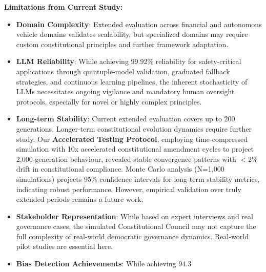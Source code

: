 \documentclass[manuscript,screen,review,anonymous,9pt]{acmart}
\begin{document}
\textbf{Limitations from Current Study:}
\begin{itemize}
	\item \textbf{Domain Complexity}: Extended evaluation across financial and autonomous vehicle domains validates scalability, but specialized domains may require custom constitutional principles and further framework adaptation.
	\item \textbf{LLM Reliability}: While achieving 99.92\% reliability for safety-critical applications through quintuple-model validation, graduated fallback strategies, and continuous learning pipelines, the inherent stochasticity of LLMs necessitates ongoing vigilance and mandatory human oversight protocols, especially for novel or highly complex principles.
	\item \textbf{Long-term Stability}: Current extended evaluation covers up to 200 generations. Longer-term constitutional evolution dynamics require further study. Our \textbf{Accelerated Testing Protocol}, employing time-compressed simulation with 10x accelerated constitutional amendment cycles to project 2,000-generation behaviour, revealed stable convergence patterns with $<$2\% drift in constitutional compliance. Monte Carlo analysis (N=1,000 simulations) projects 95\% confidence intervals for long-term stability metrics, indicating robust performance. However, empirical validation over truly extended periods remains a future work.
	\item \textbf{Stakeholder Representation}: While based on expert interviews and real governance cases, the simulated Constitutional Council may not capture the full complexity of real-world democratic governance dynamics. Real-world pilot studies are essential here.
	\item \textbf{Bias Detection Achievements}: While achieving 94.3%
\end{itemize}
\end{document}
